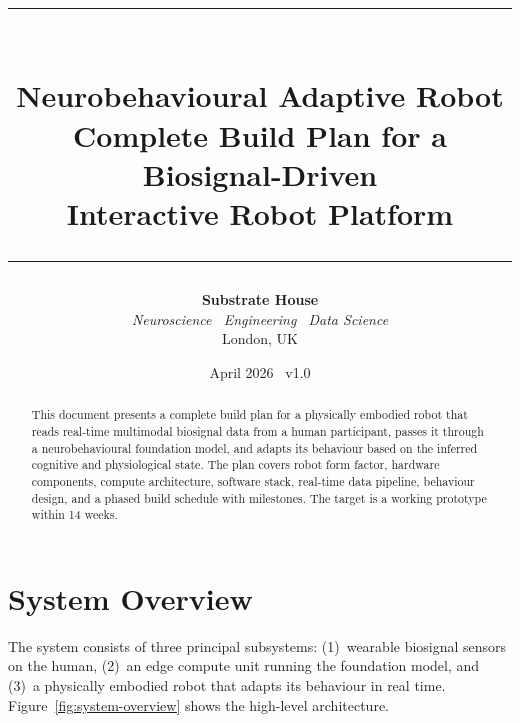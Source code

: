 \documentclass[11pt,a4paper]{article}
\title{%
  \vspace{-1cm}
  \textcolor{substrate}{\rule{\textwidth}{1.5pt}}\\[0.6cm]
  {\Huge\bfseries\textcolor{substrate}{Neurobehavioural Adaptive Robot}}\\[0.3cm]
  {\Large\textcolor{substrate!70}{Complete Build Plan for a Biosignal-Driven\\Interactive Robot Platform}}\\[0.4cm]
  \textcolor{substrate}{\rule{\textwidth}{1.5pt}}
}
\author{%
  \textbf{Substrate House}\\
  \textit{Neuroscience \textperiodcentered\ Engineering \textperiodcentered\ Data Science}\\
  London, UK
}
\date{April 2026 \textperiodcentered\ v1.0}
\begin{document}
\maketitle
\thispagestyle{fancy}

\begin{abstract}
\noindent
This document presents a complete build plan for a physically embodied robot that reads real-time multimodal biosignal data from a human participant, passes it through a neurobehavioural foundation model, and adapts its behaviour based on the inferred cognitive and physiological state. The plan covers robot form factor, hardware components, compute architecture, software stack, real-time data pipeline, behaviour design, and a phased build schedule with milestones. The target is a working prototype within 14 weeks.
\end{abstract}

\tableofcontents
\newpage

\section{System Overview}
\label{sec:overview}

The system consists of three principal subsystems: (1)~wearable biosignal sensors on the human, (2)~an edge compute unit running the foundation model, and (3)~a physically embodied robot that adapts its behaviour in real time. Figure~\ref{fig:system-overview} shows the high-level architecture.
\end{document}
